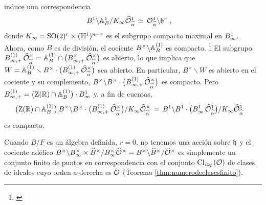 \begin{obsVariedadDeShimuraEsCompacta}
	induce una correspondencia
	\begin{align*}
		B^{1}\backslash\adeles{B}^{1}/K_{\infty}
			\Adfin{\cal{O}}^{1}_{\hhat{\alpha}} & \,\simeq\,
			\cal{O}^{1}_{\hhat{\alpha}}\backslash\hP^{r}
		\text{ ,}
	\end{align*}
	donde $K_{\infty}=\SO{2}^{r}\times(\bb{H}^{1})^{n-r}$ es el subgrupo
	compacto maximal en $\Adinf{B}^{1}$. Ahora, como $B$ es de
	divisi\'{o}n, el cociente $B^{\times}\backslash\adeles{B}^{(1)}$ es
	compacto.%
	\footnote{
		\cite[Ch.~III, \S~1]{Vigneras}
	}
	El subgrupo
	\begin{math}
		B^{(1)}_{\infty,+}\,\Idfin{\cal{O}}_{\hhat{\alpha}}=
			\adeles{B}^{(1)}\cap\big(B^{\times}_{\infty,+}\,
				\Idfin{\cal{O}}_{\hhat{\alpha}}\big)
	\end{math}
	es abierto, lo que implica que
	\begin{math}
		W=\adeles{B}^{(1)}\setmin B^{\times}\cdot\big(
			B^{(1)}_{\infty,+}\,
				\Idfin{\cal{O}}_{\hhat{\alpha}}\big)
	\end{math}
	sea abierto. En particular, $B^{\times}\backslash W$ es abierto en el
	cociente y su complemento,
	\begin{math}
		B^{\times}\backslash B^{\times}\cdot\big(B^{(1)}_{\infty,+}\,
			\Idfin{\cal{O}}_{\hhat{\alpha}}\big)
	\end{math}
	es compacto. Pero
	\begin{math}
		B_{\infty,+}^{(1)}=
			\big(\centre(\bb{R})\cap\adeles{B}^{(1)}\big)\cdot
				B_{\infty}^{1}
	\end{math}
	y, a fin de cuentas,
	\begin{align*}
		\big(\centre(\bb{R})\cap\adeles{B}^{(1)}\big)\,B^{\times}
			\backslash B^{\times}\cdot\big(B_{\infty,+}^{(1)}\,
				\Idfin{\cal{O}}_{\hhat{\alpha}}\big)/
				K_{\infty}\Idfin{\cal{O}}_{\hhat{\alpha}}
			& \,=\,
			B^{1}\backslash B^{1}\cdot\big(\Adinf{B}^{1}\,
				\Adfin{\cal{O}}^{1}_{\hhat{\alpha}}\big)/
				K_{\infty}\Adfin{\cal{O}}^{1}_{\hhat{\alpha}}
	\end{align*}
	es compacto.
\end{obsVariedadDeShimuraEsCompacta}

Cuando $B/F$ es un \'{a}lgebra definida, $r=0$, no tenemos una acci\'{o}n sobre
$\hP$ y el cociente ad\'{e}lico
\begin{math}
	B^{\times}\backslash\Idinf{B}\times\Idfin{B}/\Idinf{B}\Idfin{\cal{O}}=
	B^{\times}\backslash\Idfin{B}/\Idfin{\cal{O}}
\end{math}
es simplemente un conjunto finito de puntos en correspondencia con el conjunto
$\lClass{\cal{O}}$ de clases de ideales cuyo orden a derecha es $\cal{O}$
(Teorema \ref{thm:numerodeclasesfinito}).
